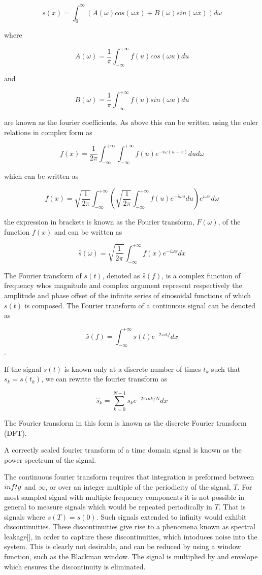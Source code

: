 $$
s(x) = \int_{0}^{\infty} \left( A(\omega) cos(\omega x) + B(\omega) sin(\omega x) \right) d\omega
$$

where

$$
A(\omega) = \frac{1}{\pi} \int_{-\infty}^{+\infty} f(u) cos(\omega u) du
$$

and

$$
B(\omega) = \frac{1}{\pi} \int_{-\infty}^{+\infty} f(u) sin(\omega u) du
$$

are known as the fourier coefficients. As above this can be written using the euler relations in complex form as

$$
f(x) = \frac{1}{2 \pi} \int_{-\infty}^{+\infty} \int_{-\infty}^{+\infty} f(u) e^{- i \omega (u - x)} du d\omega
$$

which can be written as

$$
f(x) = \sqrt{\frac{1}{2 \pi}} \int_{-\infty}^{+\infty} \left( \sqrt{\frac{1}{2 \pi}} \int_{-\infty}^{+\infty} f(u) e^{- i \omega u} du \right) e^{i \omega x} d\omega
$$

the expression in brackets is known as the Fourier transform, $F(\omega)$, of the function $f(x)$ and can be written as

$$
\hat{s}(\omega) = \sqrt{\frac{1}{2 \pi}} \int_{-\infty}^{+\infty} f(x) e^{- i \omega x} dx
$$

The Fourier transform of $s(t)$, denoted as $\hat{s}(f)$, is a complex function of frequency whos magnitude and complex argument represent respectively the amplitude and phase offset of the infinite series of sinosoidal functions of which $s(t)$ is composed. The Fourier transform of a continuous signal can be denoted as

$$
\hat{s}(f) = \int_{-\infty}^{+\infty} s(t) e^{-2 \pi i t f} dx
$$
.

If the signal $s(t)$ is known only at a discrete number of times $t_k$ such that $s_k = s(t_k)$, we can rewrite the fourier transform as

$$
\hat{s}_k = \sum_{k=0}^{N-1} s_k e^{-2 \pi i n k / N} dx
$$

The Fourier transform in this form is known as the discrete Fourier transform (DFT).

A correctly scaled fourier transform of a time domain signal is known as the power spectrum of the signal.

The continuous fourier transform requires that integration is preformed between $\-infty$ and $\infty$, or over an integer multiple of the periodicity of the signal, $T$. For most sampled signal with multiple frequency components it is not possible in general to measure signals which would be repeated periodically in $T$. That is signals where $s(T) = s(0)$. Such signals extended to infinity would exhibit discontinuities. These discontinuities give rise to a phenomena known as spectral leakage[], in order to capture these discontinuities, which intoduces noise into the system. This is clearly not desirable, and can be reduced by using a window function, such as the Blackman window. The signal is multiplied by and envelope which ensures the discontinuity is eliminated.

